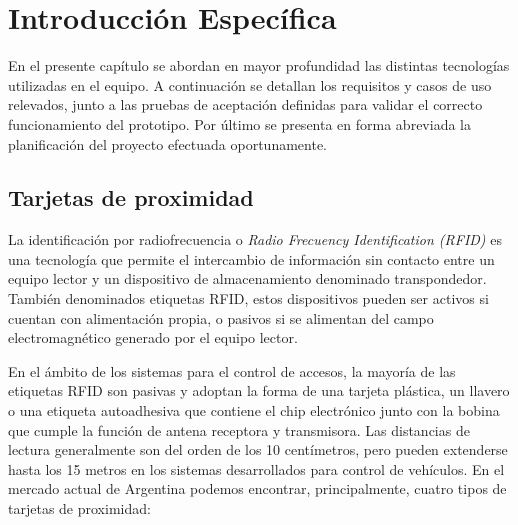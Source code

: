 
\chapter{Introducción Específica}
\label{Chapter2}

En el presente capítulo se abordan en mayor profundidad las distintas tecnologías utilizadas en el equipo. A continuación se detallan los requisitos y casos de uso relevados, junto a las pruebas de aceptación definidas para validar el correcto funcionamiento del prototipo. Por último se presenta en forma abreviada la planificación del proyecto efectuada oportunamente.

\section{Tarjetas de proximidad}
\label{sec:tarjetas}

La identificación por radiofrecuencia o \emph{Radio Frecuency Identification (RFID)} es una tecnología que permite el intercambio de información sin contacto entre un equipo lector y un dispositivo de almacenamiento denominado transpondedor. También denominados etiquetas RFID, estos dispositivos pueden ser activos si cuentan con alimentación propia, o pasivos si se alimentan del campo electromagnético generado por el equipo lector. 

En el ámbito de los sistemas para el control de accesos, la mayoría de las etiquetas RFID son pasivas y adoptan la forma de una tarjeta plástica, un llavero o una etiqueta autoadhesiva que contiene el chip electrónico junto con la bobina que cumple la función de antena receptora y transmisora. Las distancias de lectura generalmente son del orden de los 10 centímetros, pero pueden extenderse hasta los 15 metros en los sistemas desarrollados para control de vehículos. En el mercado actual de Argentina podemos encontrar, principalmente, cuatro tipos de tarjetas de proximidad:

